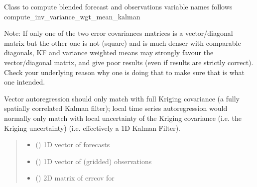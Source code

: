 \documentclass[letterpaper,10pt,english]{sphinxmanual}
\begin{document}
\begin{fulllineitems}
\label{\detokenize{kalman:glomar_gridding.autoregressive_kalman.KalmanOut}}
\pysigstartsignatures
\pysiglinewithargsret
{}
{\sphinxparamcomma {}\sphinxparamcomma {}\sphinxparamcomma {}\sphinxparamcomma {}\sphinxparamcomma {}}
{}
\pysigstopsignatures
\sphinxAtStartPar
Class to compute blended forecast and observations
variable names follows compute\_inv\_variance\_wgt\_mean\_kalman

\sphinxAtStartPar
Note:
If only one of the two error covariances matrices is a vector/diagonal
matrix but the other one is not (square) and is much denser with
comparable diagonals, KF and variance weighted means
may strongly favour the vector/diagonal matrix, and give poor
results (even if results are strictly correct). Check your
underlying reason why one is doing that to make sure that is what
one intended.

\sphinxAtStartPar
Vector autoregression should only match with full Kriging covariance
(a fully spatially correlated Kalman filter); local time series
autoregression would normally only match with local uncertainty of the
Kriging covariance (i.e. the Kriging uncertainty) (i.e. effectively a 1D
Kalman Filter).
\begin{quote}\begin{description}
\begin{itemize}
\item {}
\sphinxAtStartPar
{} () \textendash{} 1D vector of forecasts

\item {}
\sphinxAtStartPar
{} () \textendash{} 1D vector of (gridded) observations

\item {}
\sphinxAtStartPar
{} () \textendash{} 2D matrix of errcov for 


\end{itemize}
\end{description}
\end{quote}
\end{fulllineitems}
\end{document}
